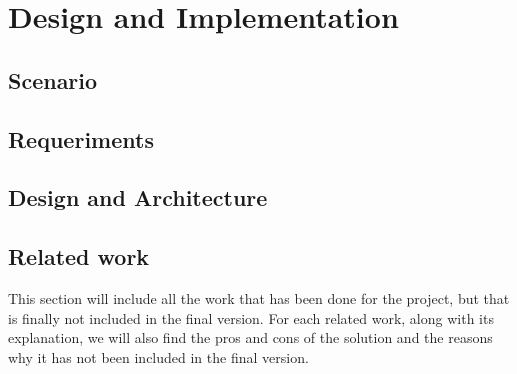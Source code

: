 \chapter{Design and Implementation}
\label{design}


\section{Scenario}
\section{Requeriments}
\section{Design and Architecture}

\section{Related work}
This section will include all the work that has been done for the project, but that is finally not included in the final version. For each related work, along with its explanation, we will also find the pros and cons of the solution and the reasons why it has not been included in the final version.


